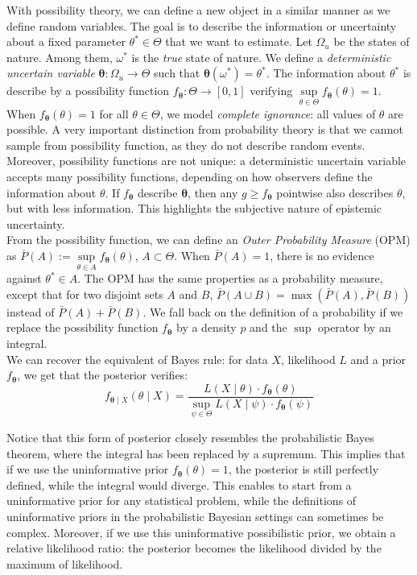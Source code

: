 \documentclass[12pt,a4paper]{article}
\theoremstyle{definition}
\theoremstyle{plain}
\newcommand{\fposs}{f_{\bm{\theta}}}
\begin{document}
\noindent With possibility theory, we can define a new object in a similar manner as we define random variables. The goal is to describe the information or uncertainty about a fixed parameter $\theta^* \in \Theta$ that we want to estimate. Let $\Omega_u$ be the states of nature. Among them, $\omega^*$ is the \emph{true} state of nature. We define a \emph{deterministic uncertain variable} $\bm{\theta} : \Omega_u \to \Theta$ such that $\bm{\theta}(\omega^*) = \theta^*$. The information about $\theta^*$ is describe by a possibility function $f_{\bm{\theta}} : \Theta \to [0,1]$ verifying $\sup\limits_{\theta \in \Theta} f_{\bm{\theta}}(\theta) = 1$. When $\fposs(\theta) = 1$ for all $\theta \in \Theta$, we model \emph{complete ignorance}: all values of $\theta$ are possible. A very important distinction from probability theory is that we cannot sample from possibility function, as they do not describe random events. Moreover, possibility functions are not unique: a deterministic uncertain variable accepts many possibility functions, depending on how observers define the information about $\theta$. If $\fposs$ describe $\bm{\theta}$, then any $g \geq \fposs $ pointwise also describes $\theta$, but with less information. This highlights the subjective nature of epistemic uncertainty. \\ 

\noindent From the possibility function, we can define an \emph{Outer Probability Measure} (OPM) as $\bar{P}(A) := \sup\limits_{\theta \in A} \fposs(\theta)$, $A \subset \Theta$. When $\bar{P}(A) = 1$, there is no evidence against $\theta^* \in A$. The OPM has the same properties as a probability measure, except that for two disjoint sets $A$ and $B$, $\bar{P}(A \cup B) = \max(\bar{P}(A), \bar{P}(B))$ instead of $\bar{P}(A) + \bar{P}(B)$. We fall back on the definition of a probability if we replace the possibility function $\fposs$ by a density $p$ and the $\sup$ operator by an integral. \\

\noindent We can recover the equivalent of Bayes rule: for data $X$, likelihood $L$ and a prior $\fposs$, we get that the posterior verifies:
$$
f_{\bm{\theta} \mid X }(\theta \mid X) = \frac{L(X \mid \theta) \cdot \fposs(\theta)}{\sup_{\psi \in \Theta}L(X \mid \psi) \cdot \fposs(\psi)}
$$

\noindent Notice that this form of posterior closely resembles the probabilistic Bayes theorem, where the integral has been replaced by a supremum. This implies that if we use the uninformative prior $\fposs(\theta) = 1$, the posterior is still perfectly defined, while the integral would diverge. This enables to start from a uninformative prior for any statistical problem, while the definitions of uninformative priors in the probabilistic Bayesian settings can sometimes be complex. Moreover, if we use this uninformative possibilistic prior, we obtain a relative likelihood ratio: the posterior becomes the likelihood divided by the maximum of likelihood. \\
\end{document}
